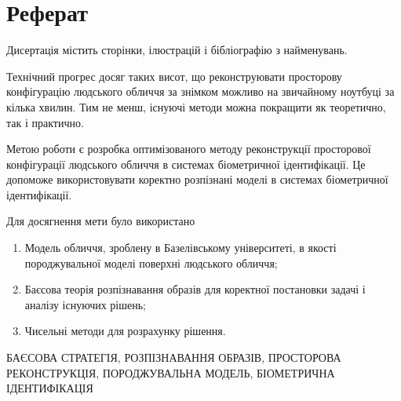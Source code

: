 \chapter*{Реферат}

Дисертація містить \pageref{LastPage} сторінки,
 ілюстрацій
і бібліографію з  найменувань.

Технічний прогрес досяг таких висот,
що реконструювати просторову конфігурацію людського обличчя за знімком
можливо на звичайному ноутбуці за кілька хвилин.
Тим не менш, існуючі методи можна покращити як теоретично, так і практично.

Метою роботи є
розробка оптимізованого методу реконструкції просторової конфігурації
людського обличчя в системах біометричної ідентифікації.
Це допоможе використовувати коректно розпізнані моделі
в системах біометричної ідентифікації.

Для досягнення мети було використано
\begin{enumerate}
  \item
    Модель обличчя, зроблену в Базелівському університеті,
    в якості породжувальної моделі поверхні людського обличчя;
  \item
    Баєсова теорія розпізнавання образів
    для коректної постановки задачі і аналізу існуючих рішень;
  \item
    Чисельні методи для розрахунку рішення.
\end{enumerate}

\MakeUppercase{баєсова стратегія, розпізнавання образів,
просторова реконструкція, породжувальна модель,
біометрична ідентифікація}
